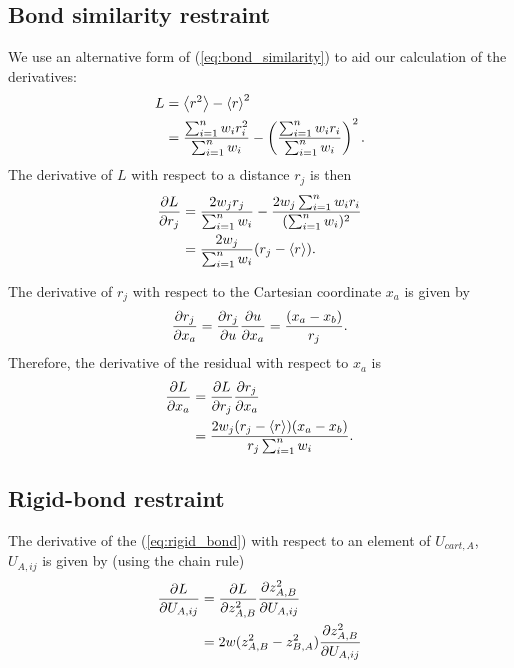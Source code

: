 \documentclass[pdf]{iucr}
\begin{document}
\subsection{Bond similarity restraint}
We use an alternative form of (\ref{eq:bond_similarity}) to aid our calculation of the derivatives:
\begin{align}
L &= \left\langle r^2 \right\rangle - \left\langle r \right\rangle^2 \nonumber\\
&= \frac{\sum_{i = 1}^n {w_i r_i^2}}{\sum_{i = 1}^n {w_i}} - 
    \left(\frac{\sum_{i = 1}^n {w_i r_i}}{\sum_{i = 1}^n {w_i}}\right)^2.
\end{align}
The derivative of $L$ with respect to a distance $r_j$ is then
\begin{align}
\frac{\partial L}{\partial r_j} &=
  \frac{2 w_j r_j}{\sum_{i=1}^n{w_i}}
  - \frac{2 w_j \sum_{i=1}^n w_i r_i}{(\sum_{i=1}^n w_i)^2}\nonumber\\
&= \frac{2 w_j}{\sum_{i=1}^n{w_i}}(r_j - \left\langle r \right\rangle).
\end{align}

The derivative of $r_j$ with respect to the Cartesian coordinate $x_a$ is given by
\begin{equation}
\frac{\partial r_j}{\partial x_a} = \frac{\partial r_j}{\partial u} \frac{\partial u}{\partial x_a}= \frac{(x_a - x_b)}{r_j}.
\end{equation}
Therefore, the derivative of the residual with respect to $x_a$ is
\begin{align}
\frac{\partial L}{\partial x_a} &= \frac{\partial L}{\partial r_j} \frac{\partial r_j}{\partial x_a}\nonumber\\
&= \frac{2 w_j (r_j - \left\langle r \right\rangle)(x_a - x_b)}{r_j \sum_{i=1}^n {w_i}}.
\end{align}

\subsection{Rigid-bond restraint}

The derivative of the (\ref{eq:rigid_bond}) with respect to an element of $U_{cart,A}$,
$U_{A,ij}$ is given by (using the chain rule)
\begin{align}
\frac{\partial L}{\partial U_{A,ij}} &= \frac{\partial L}{\partial z^2_{A,B}} \frac{\partial z^2_{A,B}}{\partial U_{A,ij}}\\
&=2w(z^2_{A,B} - z^2_{B,A}) \frac{\partial z^2_{A,B}}{\partial U_{A,ij}}\label{eqn:u_derivative}
\end{align}
\end{document}
